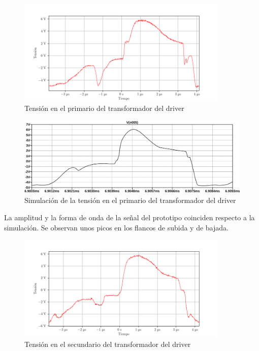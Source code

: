 
\begin{figure}[H]
    \centering
    \includegraphics[width=0.9\textwidth]{images/capturas-osciloscopio/17-11-2022/7.png}
    \caption{Tensión en el primario del transformador del driver}
    \label{fig:osc:7}
\end{figure}

\begin{figure}[H]
    \centering
    \includegraphics[width=\textwidth]{images/sim/4.pdf}
    \caption{Simulación de la tensión en el primario del transformador del driver}
    \label{fig:sim:4}
\end{figure}

La amplitud y la forma de onda de la señal del prototipo coinciden respecto a la simulación. 
Se observan unos picos en los flancos de subida y de bajada. 

\begin{figure}[H]
    \centering
    \includegraphics[width=0.9\textwidth]{images/capturas-osciloscopio/17-11-2022/9.png}
    \caption{Tensión en el secundario del transformador del driver}
    \label{fig:osc:9}
\end{figure}

